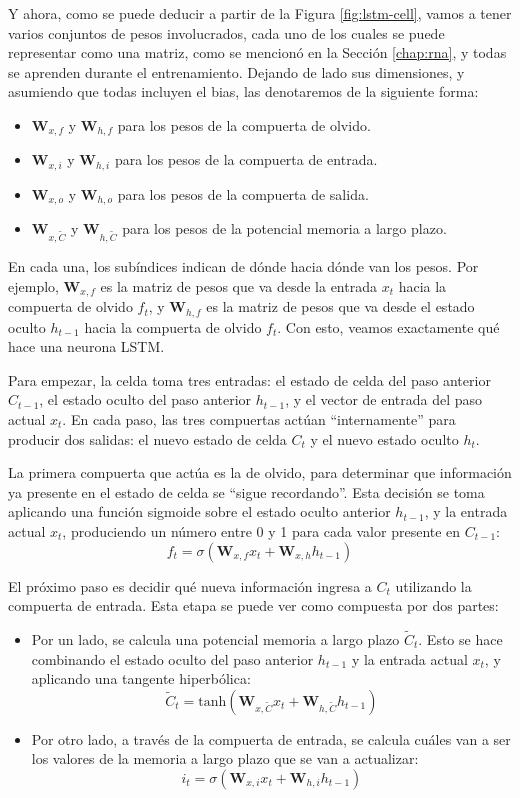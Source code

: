 \documentclass[../../main.tex]{subfiles}
\begin{document}
Y ahora, como se puede deducir a partir de la Figura \ref{fig:lstm-cell}, vamos a tener
varios conjuntos de pesos involucrados, cada uno de los cuales se puede representar como
una matriz, como se mencionó en la Sección \ref{chap:rna}, y todas se aprenden durante el
entrenamiento. Dejando de lado sus dimensiones, y asumiendo que todas incluyen el bias,
las denotaremos de la siguiente forma:
\begin{itemize}
    \item \(\bm{W}_{x,f}\) y \(\bm{W}_{h,f}\) para los pesos de la compuerta de olvido.
    \item \(\bm{W}_{x,i}\) y \(\bm{W}_{h,i}\) para los pesos de la compuerta de entrada.
    \item \(\bm{W}_{x,o}\) y \(\bm{W}_{h,o}\) para los pesos de la compuerta de salida.
    \item \(\bm{W}_{x, \tilde{C}}\) y \(\bm{W}_{h, \tilde{C}}\) para los pesos de la potencial
    memoria a largo plazo.
\end{itemize}
En cada una, los subíndices indican de dónde hacia dónde van los pesos. Por ejemplo,
\(\bm{W}_{x,f}\) es la matriz de pesos que va desde la entrada \(x_t\) hacia la compuerta
de olvido \(f_t\), y \(\bm{W}_{h,f}\) es la matriz de pesos que va desde el estado oculto
\(h_{t-1}\) hacia la compuerta de olvido \(f_t\). Con esto, veamos exactamente qué
hace una neurona LSTM.

Para empezar, la celda toma tres entradas: el estado de celda del paso anterior
\(C_{t-1}\), el estado oculto del paso anterior \(h_{t-1}\), y el vector de entrada del
paso actual \(x_t\). En cada paso, las tres compuertas actúan ``internamente'' para
producir dos salidas: el nuevo estado de celda \(C_t\) y el nuevo estado oculto \(h_t\).

La primera compuerta que actúa es la de olvido, para determinar que información ya
presente en el estado de celda se ``sigue recordando''. Esta decisión se toma aplicando
una función sigmoide sobre el estado oculto anterior \(h_{t-1}\), y la entrada actual
\(x_t\), produciendo un número entre 0 y 1 para cada valor presente en \(C_{t-1}\):
\[
    f_t = \sigma \left( \bm{W}_{x,f} x_t + \bm{W}_{x,h} h_{t-1}  \right)
\]

El próximo paso es decidir qué nueva información ingresa a \(C_t\) utilizando la compuerta
de entrada. Esta etapa se puede ver como compuesta por dos partes:
\begin{itemize}
    \item Por un lado, se calcula una potencial memoria a largo plazo \(\tilde{C}_t\).
    Esto se hace combinando el estado oculto del paso anterior \(h_{t-1}\) y la entrada
    actual \(x_t\), y aplicando una tangente hiperbólica:
    \[
        \tilde{C}_t = \text{tanh} \left( \bm{W}_{x, \tilde{C}} x_t + \bm{W}_{h, \tilde{C}} h_{t-1}  \right)
    \]
    \item Por otro lado, a través de la compuerta de entrada, se calcula cuáles
    van a ser los valores de la memoria a largo plazo que se van a actualizar:
    \[
        i_t = \sigma \left( \bm{W}_{x, i} x_t + \bm{W}_{h, i} h_{t-1}  \right)
    \]
\end{itemize}
\end{document}
